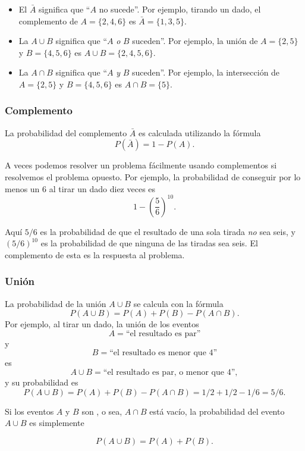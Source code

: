 \begin{itemize}
    \item El  $\bar A$ significa que ``$A$ no sucede''.
          Por ejemplo, tirando un dado, el complemento de $A=\{2,4,6\}$ es
          $\bar A = \{1,3,5\}$.
    \item La  $A \cup B$ significa que ``$A$ \emph{o} $B$ suceden''.
          Por ejemplo, la unión de $A=\{2,5\}$ y $B=\{4,5,6\}$ es
          $A \cup B = \{2,4,5,6\}$.
    \item La  $A \cap B$ significa que ``$A$ \emph{y}
          $B$ suceden''. Por ejemplo, la intersección de $A=\{2,5\}$ y
          $B=\{4,5,6\}$ es $A \cap B = \{5\}$.
\end{itemize}

\subsubsection{Complemento}

La probabilidad del complemento $\bar A$ es calculada utilizando la fórmula
\[P(\bar A)=1-P(A).\]

A veces podemos resolver un problema fácilmente usando complementos si
resolvemos el problema opuesto. Por ejemplo, la probabilidad de conseguir
por lo menos un 6 al tirar un dado diez veces es
\[1-\left(\frac{5}{6}\right)^{10}.\]

Aquí $5/6$ es la probabilidad de que el resultado de una sola tirada \emph{no}
sea seis, y $(5/6)^{10}$ es la probabilidad de que ninguna de las tiradas
sea seis. El complemento de esta es la respuesta al problema.

\subsubsection{Unión}

La probabilidad de la unión $A \cup B$ se calcula con la fórmula
\[P(A \cup B)=P(A)+P(B)-P(A \cap B).\]
Por ejemplo, al tirar un dado, la unión de los eventos
\[A=\textrm{``el resultado es par''}\]
y
\[B=\textrm{``el resultado es menor que 4''}\]
es
\[A \cup B=\textrm{``el resultado es par, o menor que 4''},\]
y su probabilidad es
\[P(A \cup B) = P(A)+P(B)-P(A \cap B)=1/2+1/2-1/6=5/6.\]

Si los eventos $A$ y $B$ son , o sea, $A \cap B$ está vacío,
la probabilidad del evento $A \cup B$ es simplemente

\[P(A \cup B)=P(A)+P(B).\]

